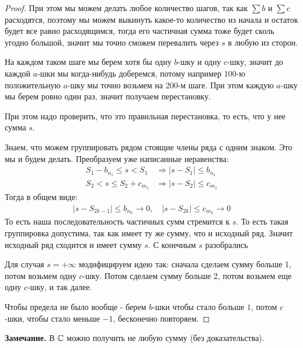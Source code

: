 \begin{proof}
    При этом мы можем делать любое количество шагов, так как $\sum b$ и $\sum c$ расходятся, поэтому мы можем
    выкинуть какое-то количество из начала и остаток будет все равно расходящимся, тогда его частичная сумма тоже будет сколь угодно большой,
    значит мы точно сможем перевалить через $s$ в любую из сторон.

    На каждом таком шаге мы берем хотя бы одну $b$-шку и одну $c$-шку, значит до каждой $a$-шки мы когда-нибудь доберемся, потому
    например $100$-ю положительную $a$-шку мы точно возьмем на 200-м шаге.
    При этом каждую $a$-шку мы берем ровно один раз, значит получаем перестановку.
    
    При этом надо проверить, что это правильная перестановка, то есть, что у нее сумма $s$.

    Знаем, что можем группировать рядом стоящие члены ряда с одним знаком. Это мы и будем делать. 
    Преобразуем уже написанные неравенства:
    \begin{align*}
        S_1 - b_{n_1} \leqslant s < S_1 &\Longrightarrow |s - S_1| \leqslant b_{n_1} \\
        S_2 < s \leqslant S_2 + c_{m_1} &\Longrightarrow |s - S_2| \leqslant c_{m_1}
    \end{align*}
    Тогда в общем виде:
    \begin{gather*}
        |s - S_{2k-1}| \leq b_{n_k} \to 0, \quad |s - S_{2k}| \leq c_{m_k} \to 0
    \end{gather*}
    То есть наша последовательность частичных сумм стремится к $s$. То есть такая группировка допустима, так как имеет ту же сумму, что и исходный ряд. 
    Значит исходный ряд сходится и имеет сумму $s$. С конечным $s$ разобрались

    Для случая $s = +\infty$ модифицируем идею так: сначала сделаем сумму больше 1, потом возьмем одну $c$-шку. Потом сделаем
    сумму больше 2, потом возьмем еще одну $c$-шку, и так далее. 
    
    Чтобы предела не было вообще - берем $b$-шки чтобы стало больше $1$,
    потом $c$-шки, чтобы стало меньше $-1$, бесконечно повторяем.
\end{proof}

\textbf{Замечание.} В $\mathbb{C}$ можно получить не любую сумму (без доказательства).
